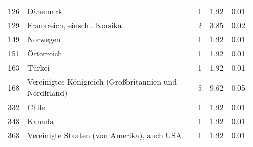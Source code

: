 \begin{longtable}{lXrrr}
        126 & \multicolumn{1}{X}{Dänemark} & %
          \num{1} &
          \num[round-mode=places,round-precision=2]{1,92} &
          \num[round-mode=places,round-precision=2]{0,01} \\

        129 & \multicolumn{1}{X}{Frankreich, einschl. Korsika} & %
          \num{2} &
          \num[round-mode=places,round-precision=2]{3,85} &
          \num[round-mode=places,round-precision=2]{0,02} \\

        149 & \multicolumn{1}{X}{Norwegen} & %
          \num{1} &
          \num[round-mode=places,round-precision=2]{1,92} &
          \num[round-mode=places,round-precision=2]{0,01} \\

        151 & \multicolumn{1}{X}{Österreich} & %
          \num{1} &
          \num[round-mode=places,round-precision=2]{1,92} &
          \num[round-mode=places,round-precision=2]{0,01} \\

        163 & \multicolumn{1}{X}{Türkei} & %
          \num{1} &
          \num[round-mode=places,round-precision=2]{1,92} &
          \num[round-mode=places,round-precision=2]{0,01} \\

        168 & \multicolumn{1}{X}{Vereinigtes Königreich (Großbritannien und Nordirland)} & %
          \num{5} &
          \num[round-mode=places,round-precision=2]{9,62} &
          \num[round-mode=places,round-precision=2]{0,05} \\

        332 & \multicolumn{1}{X}{Chile} & %
          \num{1} &
          \num[round-mode=places,round-precision=2]{1,92} &
          \num[round-mode=places,round-precision=2]{0,01} \\

        348 & \multicolumn{1}{X}{Kanada} & %
          \num{1} &
          \num[round-mode=places,round-precision=2]{1,92} &
          \num[round-mode=places,round-precision=2]{0,01} \\

        368 & \multicolumn{1}{X}{Vereinigte Staaten (von Amerika), auch USA} & %
          \num{1} &
          \num[round-mode=places,round-precision=2]{1,92} &
          \num[round-mode=places,round-precision=2]{0,01} \\


\end{longtable}
